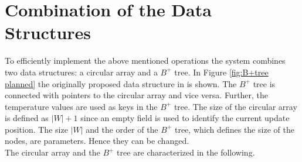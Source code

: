 \documentclass[abstracton,12pt]{scrreprt}
\begin{document}
\section{Combination of the Data Structures}
\label{sec:das}
To efficiently implement the above mentioned operations the system combines two data structures:
a circular array and a $B^+$ tree. In Figure \ref{fig:B+tree planned} the originally proposed data structure in \cite{BScT} is shown. The $B^+$ tree is connected with pointers to the circular array and vice versa. Further, the temperature values are used as keys in the $B^+$ tree. The size of the circular array is defined as $|W| + 1$ since an empty field is used to identify the current update position. The size $|W|$ and the order of the $B^+$ tree, which defines the size of the nodes, are parameters. Hence they can be changed.\\The circular array and the $B^+$ tree are characterized in the following. 
\end{document}
